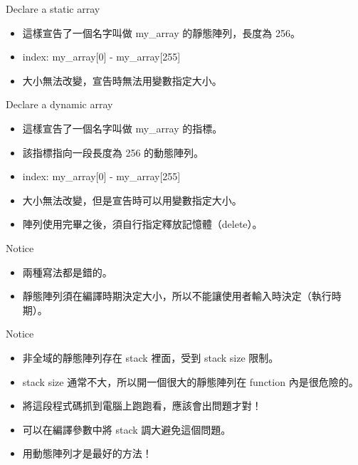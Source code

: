 \documentclass[t]{beamer}
\begin{document}
\begin{frame}{Declare a static array}
  
  \begin{itemize}
    \item 這樣宣告了一個名字叫做 my\_array 的靜態陣列，長度為 256。
    \item index: my\_array[0] - my\_array[255]
    \item 大小無法改變，宣告時無法用變數指定大小。
  \end{itemize}
\end{frame}

\begin{frame}{Declare a dynamic array}
  
  \begin{itemize}
    \item 這樣宣告了一個名字叫做 my\_array 的指標。
    \item 該指標指向一段長度為 256 的動態陣列。
    \item index: my\_array[0] - my\_array[255]
    \item 大小無法改變，但是宣告時可以用變數指定大小。
    \item 陣列使用完畢之後，須自行指定釋放記憶體（delete）。
  \end{itemize}
\end{frame}

\begin{frame}{Notice}
  
  \begin{itemize}
    \item 兩種寫法都是錯的。
    \item 靜態陣列須在編譯時期決定大小，所以不能讓使用者輸入時決定（執行時期）。
  \end{itemize}
\end{frame}

\begin{frame}{Notice}
  
  \begin{itemize}
    \item 非全域的靜態陣列存在 stack 裡面，受到 stack size 限制。
    \item stack size 通常不大，所以開一個很大的靜態陣列在 function 內是很危險的。
    \item 將這段程式碼抓到電腦上跑跑看，應該會出問題才對！
    \item 可以在編譯參數中將 stack 調大避免這個問題。
    \item 用動態陣列才是最好的方法！
  \end{itemize}
\end{frame}
\end{document}

